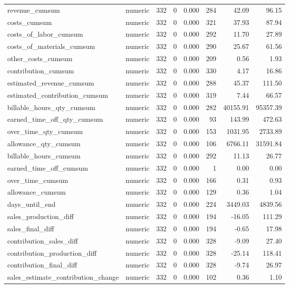 \begin{landscape}
\begin{longtable}[t]{llrrrrrr}
revenue\_cumsum & numeric & 332 & 0 & 0.000 & 284 & 42.09 & 96.15\\
costs\_cumsum & numeric & 332 & 0 & 0.000 & 321 & 37.93 & 87.94\\
costs\_of\_labor\_cumsum & numeric & 332 & 0 & 0.000 & 292 & 11.70 & 27.89\\
costs\_of\_materials\_cumsum & numeric & 332 & 0 & 0.000 & 290 & 25.67 & 61.56\\
other\_costs\_cumsum & numeric & 332 & 0 & 0.000 & 209 & 0.56 & 1.93\\
contribution\_cumsum & numeric & 332 & 0 & 0.000 & 330 & 4.17 & 16.86\\
estimated\_revenue\_cumsum & numeric & 332 & 0 & 0.000 & 288 & 45.37 & 111.50\\
estimated\_contribution\_cumsum & numeric & 332 & 0 & 0.000 & 319 & 7.44 & 66.57\\
billable\_hours\_qty\_cumsum & numeric & 332 & 0 & 0.000 & 282 & 40155.91 & 95357.39\\
earned\_time\_off\_qty\_cumsum & numeric & 332 & 0 & 0.000 & 93 & 143.99 & 472.63\\
over\_time\_qty\_cumsum & numeric & 332 & 0 & 0.000 & 153 & 1031.95 & 2733.89\\
allowance\_qty\_cumsum & numeric & 332 & 0 & 0.000 & 106 & 6766.11 & 31591.84\\
billable\_hours\_cumsum & numeric & 332 & 0 & 0.000 & 292 & 11.13 & 26.77\\
earned\_time\_off\_cumsum & numeric & 332 & 0 & 0.000 & 1 & 0.00 & 0.00\\
over\_time\_cumsum & numeric & 332 & 0 & 0.000 & 166 & 0.31 & 0.93\\
allowance\_cumsum & numeric & 332 & 0 & 0.000 & 129 & 0.36 & 1.04\\
days\_until\_end & numeric & 332 & 0 & 0.000 & 224 & 3449.03 & 4839.56\\
sales\_production\_diff & numeric & 332 & 0 & 0.000 & 194 & -16.05 & 111.29\\
sales\_final\_diff & numeric & 332 & 0 & 0.000 & 194 & -0.65 & 17.98\\
contribution\_sales\_diff & numeric & 332 & 0 & 0.000 & 328 & -9.09 & 27.40\\
contribution\_production\_diff & numeric & 332 & 0 & 0.000 & 328 & -25.14 & 118.41\\
contribution\_final\_diff & numeric & 332 & 0 & 0.000 & 328 & -9.74 & 26.97\\
sales\_estimate\_contribution\_change & numeric & 332 & 0 & 0.000 & 102 & 0.36 & 1.10\\

\end{longtable}
\end{landscape}
